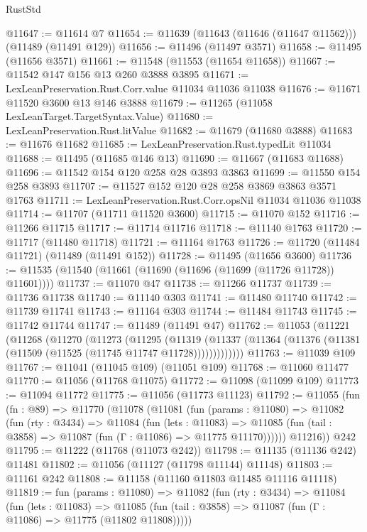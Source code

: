 \begin{lexlean}{RustStd}
\begin{coremodule}
@11647 := @11614 @7
@11654 := @11639 (@11643 (@11646 (@11647 @11562))) (@11489 (@11491 @129))
@11656 := @11496 (@11497 @3571)
@11658 := @11495 (@11656 @3571)
@11661 := @11548 (@11553 (@11654 @11658))
@11667 := @11542 @147 @156 @13 @260 @3888 @3895
@11671 := LexLeanPreservation.Rust.Corr.value @11034 @11036 @11038
@11676 := @11671 @11520 @3600 @13 @146 @3888
@11679 := @11265 (@11058 LexLeanTarget.TargetSyntax.Value)
@11680 := LexLeanPreservation.Rust.litValue
@11682 := @11679 (@11680 @3888)
@11683 := @11676 @11682
@11685 := LexLeanPreservation.Rust.typedLit @11034
@11688 := @11495 (@11685 @146 @13)
@11690 := @11667 (@11683 @11688)
@11696 := @11542 @154 @120 @258 @28 @3893 @3863
@11699 := @11550 @154 @258 @3893
@11707 := @11527 @152 @120 @28 @258 @3869 @3863 @3571 @1763
@11711 := LexLeanPreservation.Rust.Corr.opsNil @11034 @11036 @11038
@11714 := @11707 (@11711 @11520 @3600)
@11715 := @11070 @152
@11716 := @11266 @11715
@11717 := @11714 @11716
@11718 := @11140 @1763
@11720 := @11717 (@11480 @11718)
@11721 := @11164 @1763
@11726 := @11720 (@11484 @11721) (@11489 (@11491 @152))
@11728 := @11495 (@11656 @3600)
@11736 := @11535 (@11540 (@11661 (@11690 (@11696 (@11699 (@11726 @11728)) @11601))))
@11737 := @11070 @47
@11738 := @11266 @11737
@11739 := @11736 @11738
@11740 := @11140 @303
@11741 := @11480 @11740
@11742 := @11739 @11741
@11743 := @11164 @303
@11744 := @11484 @11743
@11745 := @11742 @11744
@11747 := @11489 (@11491 @47)
@11762 := @11053
    (@11221
      (@11268
        (@11270
          (@11273
            (@11295
              (@11319
                (@11337 (@11364 (@11376 (@11381 (@11509 (@11525 (@11745 @11747 @11728)))))))))))))
@11763 := @11039 @109
@11767 := @11041 (@11045 @109) (@11051 @109)
@11768 := @11060 @11477
@11770 := @11056 (@11768 @11075)
@11772 := @11098 (@11099 @109)
@11773 := @11094 @11772
@11775 := @11056 (@11773 @11123)
@11792 := @11055
    (fun (fn : @89) =>
    @11770
      (@11078
        (@11081
          (fun (params : @11080) =>
          @11082
            (fun (rty : @3434) =>
            @11084
              (fun (lets : @11083) =>
              @11085 (fun (tail : @3858) => @11087 (fun (Γ : @11086) => @11775 @11170))))))
        @11216))
    @242
@11795 := @11222 (@11768 (@11073 @242))
@11798 := @11135 (@11136 @242) @11481
@11802 := @11056 (@11127 (@11798 @11144) @11148)
@11803 := @11161 @242
@11808 := @11158 (@11160 @11803 @11485 @11116 @11118)
@11819 := fun (params : @11080) =>
  @11082
    (fun (rty : @3434) =>
    @11084
      (fun (lets : @11083) =>
      @11085 (fun (tail : @3858) => @11087 (fun (Γ : @11086) => @11775 (@11802 @11808)))))

\end{coremodule}
\end{lexlean}
